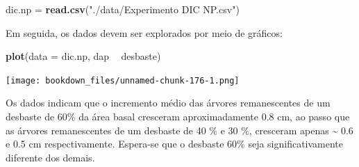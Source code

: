 \documentclass[
]{article}
\newenvironment{Shaded}{\begin{snugshade}}{\end{snugshade}}
\newcommand{\DataTypeTok}[1]{\textcolor[rgb]{0.13,0.29,0.53}{#1}}
\newcommand{\KeywordTok}[1]{\textcolor[rgb]{0.13,0.29,0.53}{\textbf{#1}}}
\newcommand{\NormalTok}[1]{#1}
\newcommand{\OperatorTok}[1]{\textcolor[rgb]{0.81,0.36,0.00}{\textbf{#1}}}
\newcommand{\OtherTok}[1]{\textcolor[rgb]{0.56,0.35,0.01}{#1}}
\newcommand{\StringTok}[1]{\textcolor[rgb]{0.31,0.60,0.02}{#1}}
\begin{document}
\begin{Shaded}
\begin{Highlighting}[]
\NormalTok{dic.np =}\StringTok{ }\KeywordTok{read.csv}\NormalTok{(}\StringTok{"./data/Experimento DIC NP.csv"}\NormalTok{)}
\end{Highlighting}
\end{Shaded}

Em seguida, os dados devem ser explorados por meio de gráficos:

\begin{Shaded}
\begin{Highlighting}[]
\KeywordTok{plot}\NormalTok{(}\DataTypeTok{data =}\NormalTok{ dic.np, dap }\OperatorTok{~}\StringTok{ }\NormalTok{desbaste)}
\end{Highlighting}
\end{Shaded}

\texttt{[image: bookdown\_files/unnamed-chunk-176-1.png]}

Os dados indicam que o incremento médio das árvores remanescentes de um desbaste de 60\% da área basal cresceram aproximadamente 0.8 cm, ao passo que as árvores remanescentes de um desbaste de 40 \% e 30 \%, cresceram apenas \textasciitilde{} 0.6 e 0.5 cm respectivamente. Espera-se que o desbaste 60\% seja significativamente diferente dos demais.

\begin{Shaded}
\end{Shaded}
\end{document}
